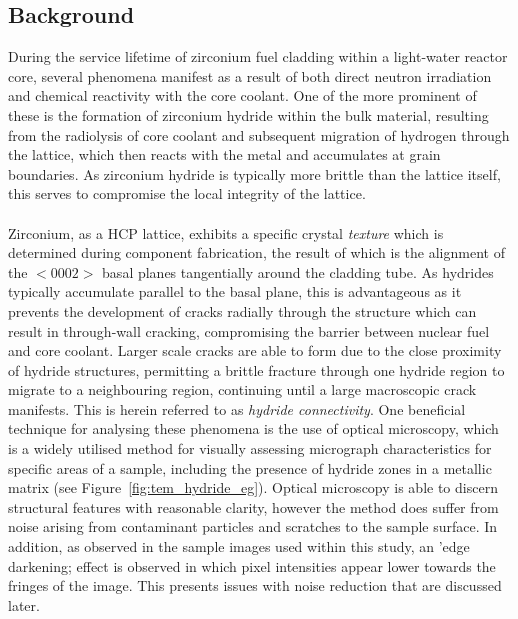 \documentclass{article}
\begin{document}
	\subsection{Background}
	During the service lifetime of zirconium fuel cladding within a light-water reactor core, several phenomena manifest as a result of both direct neutron irradiation and chemical reactivity with the core coolant. One of the more prominent of these is the formation of zirconium hydride within the bulk material, resulting from the radiolysis of core coolant and subsequent migration of hydrogen through the lattice, which then reacts with the metal and accumulates at grain boundaries. As zirconium hydride is typically more brittle than the lattice itself, this serves to compromise the local integrity of the lattice. 
	\\
	\\
	Zirconium, as a HCP lattice, exhibits a specific crystal \textit{texture} which is determined during component fabrication, the result of which is the alignment of the $<0002>$ basal planes tangentially around the cladding tube. As hydrides typically accumulate parallel to the basal plane, this is advantageous as it prevents the development of cracks radially through the structure which can result in through-wall cracking, compromising the barrier between nuclear fuel and core coolant. Larger scale cracks are able to form due to the close proximity of hydride structures, permitting a brittle fracture through one hydride region to migrate to a neighbouring region, continuing until a large macroscopic crack manifests. This is herein referred to as \textit{hydride connectivity}. One beneficial technique for analysing these phenomena is the use of optical microscopy, which is a widely utilised method for visually assessing micrograph characteristics for specific areas of a sample, including the presence of hydride zones in a metallic matrix (see Figure~\ref{fig:tem_hydride_eg}). Optical microscopy is able to discern structural features with reasonable clarity, however the method does suffer from noise arising from contaminant particles and scratches to the sample surface. In addition, as observed in the sample images used within this study, an 'edge darkening; effect is observed in which pixel intensities appear lower towards the fringes of the image. This presents issues with noise reduction that are discussed later.
	\\
\end{document}
